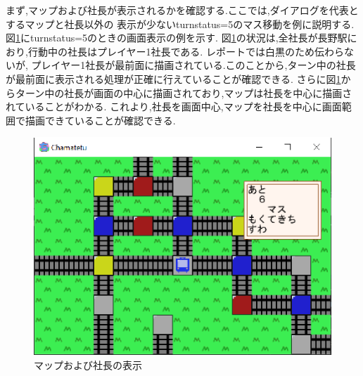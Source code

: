 \documentclass[a4j]{jarticle}
\begin{document}
    まず,マップおよび社長が表示されるかを確認する.ここでは,ダイアログを代表とするマップと社長以外の
    表示が少ないturnstatus=5のマス移動を例に説明する.図\ref{mapplay1}にturnstatus=5のときの画面表示の例を示す.
    図\ref{mapplay1}の状況は,全社長が長野駅におり,行動中の社長はプレイヤー1社長である. レポートでは白黒のため伝わらないが,
    プレイヤー1社長が最前面に描画されている.このことから,ターン中の社長が最前面に表示される処理が正確に行えていることが確認できる.
    さらに図\ref{mapplay1}からターン中の社長が画面の中心に描画されており,マップは社長を中心に描画されていることがわかる.
    これより,社長を画面中心,マップを社長を中心に画面範囲で描画できていることが確認できる.

            \begin{figure}[H]
                \centering
                \includegraphics[scale=1.3]{mapplay1.eps}
                \caption{マップおよび社長の表示}
                 \label{mapplay1}
                \end{figure} 
\end{document}
